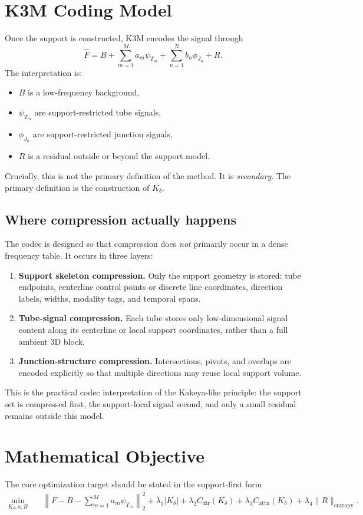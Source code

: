 \documentclass[11pt]{article}
\begin{document}
\section{K3M Coding Model}
Once the support is constructed, K3M encodes the signal through
\begin{equation}
\hat F = B + \sum_{m=1}^{M} a_m\psi_{T_m} + \sum_{n=1}^{N} b_n\phi_{J_n} + R.
\end{equation}
The interpretation is:
\begin{itemize}[leftmargin=1.5em]
\item $B$ is a low-frequency background,
\item $\psi_{T_m}$ are support-restricted tube signals,
\item $\phi_{J_n}$ are support-restricted junction signals,
\item $R$ is a residual outside or beyond the support model.
\end{itemize}

Crucially, this is not the primary definition of the method. It is \emph{secondary}. The primary definition is the construction of $K_\delta$.

\subsection{Where compression actually happens}
The codec is designed so that compression does \emph{not} primarily occur in a dense frequency table. It occurs in three layers:
\begin{enumerate}[leftmargin=1.5em]
\item \textbf{Support skeleton compression.} Only the support geometry is stored: tube endpoints, centerline control points or discrete line coordinates, direction labels, widths, modality tags, and temporal spans.
\item \textbf{Tube-signal compression.} Each tube stores only low-dimensional signal content along its centerline or local support coordinates, rather than a full ambient 3D block.
\item \textbf{Junction-structure compression.} Intersections, pivots, and overlaps are encoded explicitly so that multiple directions may reuse local support volume.
\end{enumerate}
This is the practical codec interpretation of the Kakeya-like principle: the support set is compressed first, the support-local signal second, and only a small residual remains outside this model.

\section{Mathematical Objective}
The core optimization target should be stated in the support-first form
\begin{align}
\min_{K_\delta,a,B}\quad
&\left\|F-B-\sum_{m=1}^{M} a_m \psi_{T_m}\right\|_2^2
+\lambda_1 |K_\delta|
+\lambda_2 C_{\mathrm{dir}}(K_\delta)
+\lambda_3 C_{\mathrm{attn}}(K_\delta)
+\lambda_4 \|R\|_{\mathrm{entropy}}.
\end{align}
\end{document}
